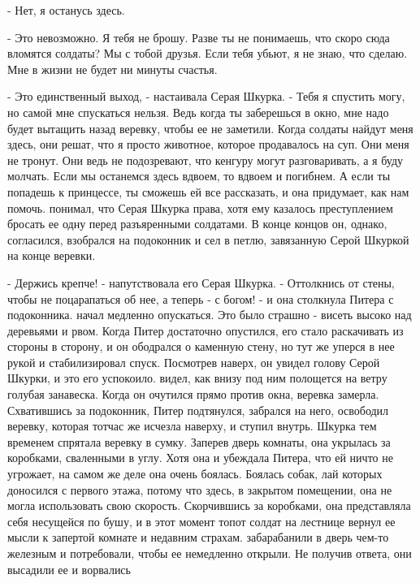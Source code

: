 \par- Нет, я останусь здесь.
\par- Это невозможно. Я тебя не брошу. Разве ты не понимаешь, что 
скоро сюда вломятся солдаты? Мы с тобой друзья. Если тебя убьют, я не 
знаю, что сделаю. Мне в жизни не будет ни минуты счастья.
\par- Это единственный выход, - настаивала Серая Шкурка. - Тебя я 
спустить могу, но самой мне спускаться нельзя. Ведь когда ты 
заберешься в окно, мне надо будет вытащить назад веревку, чтобы ее не 
заметили. Когда солдаты найдут меня здесь, они решат, что я просто 
животное, которое продавалось на суп. Они меня не тронут. Они ведь не 
подозревают, что кенгуру могут разговаривать, а я буду молчать. Если 
мы останемся здесь вдвоем, то вдвоем и погибнем. А если ты попадешь к 
принцессе, ты сможешь ей все рассказать, и она придумает, как нам 
помочь.
 понимал, что Серая Шкурка права, хотя ему казалось 
преступлением бросать ее одну перед разъяренными солдатами. В конце 
концов он, однако, согласился, взобрался на подоконник и сел в петлю, 
завязанную Серой Шкуркой на конце веревки.
\par- Держись крепче! - напутствовала его Серая Шкурка. - Оттолкнись 
от стены, чтобы не поцарапаться об нее, а теперь - с богом! - и она 
столкнула Питера с подоконника.
 начал медленно опускаться. Это было страшно - висеть высоко 
над деревьями и рвом. Когда Питер достаточно опустился, его стало 
раскачивать из стороны в сторону, и он ободрался о каменную стену, но 
тут же уперся в нее рукой и стабилизировал спуск. Посмотрев наверх, он 
увидел голову Серой Шкурки, и это его успокоило.
 видел, как внизу под ним полощется на ветру голубая 
занавеска. Когда он очутился прямо против окна, веревка замерла. 
Схватившись за подоконник, Питер подтянулся, забрался на него, 
освободил веревку, которая тотчас же исчезла наверху, и ступил внутрь.
 Шкурка тем временем спрятала веревку в сумку. Заперев дверь 
комнаты, она укрылась за коробками, сваленными в углу. Хотя она и 
убеждала Питера, что ей ничто не угрожает, на самом же деле она очень 
боялась. Боялась собак, лай которых доносился с первого этажа, потому 
что здесь, в закрытом помещении, она не могла использовать свою 
скорость. Скорчившись за коробками, она представляла себя несущейся по 
бушу, и в этот момент топот солдат на лестнице вернул ее мысли к 
запертой комнате и недавним страхам.
 забарабанили в дверь чем-то железным и потребовали, чтобы 
ее немедленно открыли. Не получив ответа, они высадили ее и ворвались 
